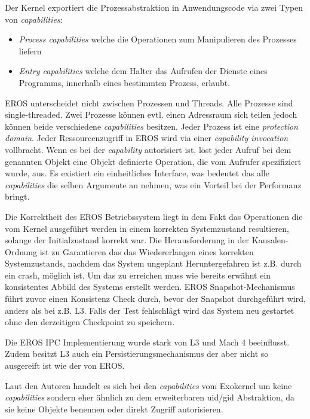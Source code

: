 \documentclass[11pt,technote]{IEEEtran}
\begin{document}
      Der Kernel exportiert die Prozessabstraktion in Anwendungscode via zwei Typen von \textit{capabilities}:
      \begin{itemize}
        \item \textit{Process capabilities} welche die Operationen zum Manipulieren des Prozesses liefern 
        \item \textit{Entry capabilities} welche dem Halter das Aufrufen der Dienste eines Programms, innerhalb eines bestimmten Prozess, erlaubt.
      \end{itemize}
        
      EROS unterscheidet nicht zwischen Prozessen und Threads. Alle Prozesse sind single-threaded. Zwei Prozesse k\"onnen evtl. einen Adressraum sich teilen
      jedoch k\"onnen beide verschiedene \textit{capabilities} besitzen. Jeder Prozess ist eine \textit{protection domain}.
      Jeder Ressourcenzugriff in EROS wird via einer \textit{capability invocation} vollbracht. Wenn es bei der \textit{capability} autorisiert ist,
      l\"ost jeder Aufruf bei dem genannten Objekt eine Objekt definierte Operation, die vom Aufrufer spezifiziert wurde, aus. 
      Es existiert ein einheitliches Interface, was bedeutet das alle \textit{capabilities} die selben Argumente an nehmen,
      was ein Vorteil bei der Performanz bringt.
        
      Die Korrektheit des EROS Betriebssystem liegt in dem Fakt das Operationen die vom Kernel ausgef\"uhrt werden  
      in einem korrekten Systemzustand resultieren, solange der Initialzustand korrekt war. Die Herausforderung in der Kausalen-Ordnung ist
      zu Garantieren das das Wiedererlangen eines korrekten Systemzustands, nachdem das System ungeplant Heruntergefahren ist z.B. durch ein crash, m\"oglich ist.
      Um das zu erreichen muss wie bereits erw\"ahnt ein konsistentes Abbild des Systems erstellt werden.
      EROS Snapshot-Mechanismus f\"uhrt zuvor einen Konsistenz Check durch, bevor der Snapshot durchgef\"uhrt wird, 
      anders als bei z.B. L3. Falls der Test fehlschl\"agt wird das System neu gestartet ohne den derzeitigen Checkpoint zu speichern. 
 
      Die EROS IPC Implementierung wurde stark von L3 und Mach 4 beeinflusst. Zudem besitzt L3 auch ein Persistierungsmechanismus der aber nicht so ausgereift 
      ist wie der von EROS.
        
      Laut den Autoren \cite{inproc:eros} handelt es sich bei den \textit{capabilities} vom Exokernel um keine 
      \textit{capabilities} sondern eher \"ahnlich zu dem erweiterbaren uid/gid Abstraktion, da sie keine Objekte benennen oder direkt Zugriff autorisieren.
      
\end{document}
